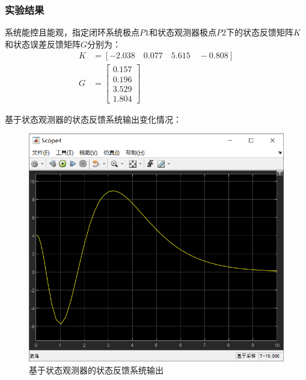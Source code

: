 \documentclass[UTF8]{article}
\begin{document}
\subsubsection{实验结果}
系统能控且能观，指定闭环系统极点$P1$和状态观测器极点$P2$下的状态反馈矩阵$K$和状态误差反馈矩阵$G$分别为：
\begin{align*}
    K &= [-2.038 \quad 0.077 \quad 5.615 \quad -0.808] \\
    G &= 
    \begin{bmatrix}
        0.157 \\
        0.196 \\
        3.529 \\
        1.804
    \end{bmatrix}
\end{align*}

\noindent 基于状态观测器的状态反馈系统输出变化情况：
\begin{figure}[H]
    \centering %
    \includegraphics[width=.8\textwidth]{figure/exp3_3_基于状态观测器的状态反馈_输出.png} 
    \caption{基于状态观测器的状态反馈系统输出} %
\end{figure}
\end{document}
